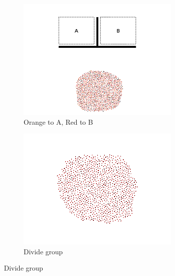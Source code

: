 \documentclass[]{article}
\begin{document}
\begin{figure}
\begin{subfigure}{0.42\textwidth}
		\includegraphics[width=\linewidth]{slide_images/Swarm_Robot_Control_-_1000_Robot_0015.png}
		\caption{Orange to A, Red to B}
		\label{fig:sub1}
	\end{subfigure}%
	\begin{subfigure}{0.42\textwidth}
		\centering
		\includegraphics[width=\linewidth]{slide_images/Swarm_Robot_Control_-_1000_Robot_0017.png}
		\caption{Divide group}
		\label{fig:sub2}
	\end{subfigure}
\end{figure}
\end{document}

